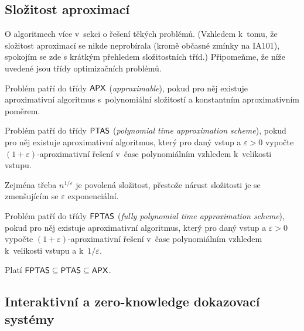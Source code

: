 \subsection{Složitost aproximací}

O algoritmech více v~sekci o řešení těkých problémů.
(Vzhledem k~tomu, že složitost aproximací se nikde neprobírala (kromě
občasné zmínky 
na IA101), spokojím se zde s krátkým přehledem složitostních tříd.)
Připomeňme, že níže uvedené jsou třídy optimizačních problémů.

\begin{definition}
    Problém patří do třídy ${\mathsf{APX}}$ ({\em approximable}), pokud pro něj existuje
    aproximativní algoritmus s~polynomiální složitostí
    a konstantním aproximativním poměrem.
\end{definition}

\begin{definition}
    Problém patří do třídy ${\mathsf{PTAS}}$ ({\em polynomial time approximation
    scheme}), pokud pro něj existuje
    aproximativní algoritmus, který pro daný vstup a $\varepsilon > 0$
    vypočte $(1+\varepsilon)$-aproximativní řešení
    v~čase polynomiálním vzhledem k~velikosti vstupu.
\end{definition}

Zejména třeba $n^{1/\varepsilon}$ je povolená
složitost, přestože nárust složitosti je se zmenšujícím se $\varepsilon$
exponenciální.

\begin{definition}
    Problém patří do třídy ${\mathsf{FPTAS}}$ ({\em fully polynomial time approximation
    scheme}), pokud pro něj existuje
    aproximativní algoritmus, který pro daný vstup a $\varepsilon > 0$
    vypočte $(1+\varepsilon)$-aproximativní řešení
    v~čase polynomiálním vzhledem k~velikosti vstupu a k~$1/\varepsilon$.
\end{definition}

Platí ${\mathsf{FPTAS}} \subseteq {\ensuremath{\mathsf{PTAS}}} \subseteq {\ensuremath{\mathsf{APX}}}$.

\subsection{Interaktivní a zero-knowledge dokazovací systémy}

